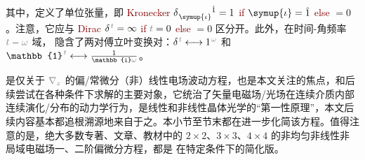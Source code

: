 其中，定义了单位张量，即 \textcolor{Maroon}{Kronecker} $\delta^{\;\! \hphantom{\symup{\iota}} \hat{1}}_{\;\! \symup{\iota} \hphantom{z}} = 1$ \textcolor{Maroon}{if} $\symup{\iota} = \hat{1}$ \textcolor{Maroon}{else} $= 0$。注意，它应与 \textcolor{Maroon}{Dirac} $\delta^{\;\! \mathcolor{gray}{t}} = \infty$ \textcolor{Maroon}{if} $\mathcolor{gray}{t} = 0$ \textcolor{Maroon}{else} $= 0$ 区分开。此外，在时间-角频率 $\mathcolor{gray}{t} - \mathcolor{gray}{\omega}$ 域， 隐含了两对傅立叶变换对：$\delta^{\;\! \mathcolor{gray}{t}} \longleftrightarrow 1^{\;\! \mathcolor{gray}{\omega}}$ 和 $\mathbb{1}^{\;\! \mathcolor{gray}{t}} \longleftrightarrow \frac{1}{\mathbb{i} \mathcolor{gray}{\omega}}$。

 是仅关于 $\mathcolor{gray}{\nabla_z}$ 的偏/常微分（非）线性电场波动方程，也是本文关注的焦点，和后续尝试在各种条件下求解的主要对象，它统治了矢量电磁场/光场在连续介质内部连续演化/分布的动力学行为，是线性和非线性晶体光学的“第一性原理”，本文后续内容基本都追根溯源地来自于之。本小节至节末都在进一步化简该方程。值得注意的是，绝大多数专著、文章、教材中的 $2 \times 2$、$3 \times 3$、$4 \times 4$ 的非均匀非线性非局域电磁场一、二阶偏微分方程\cite{zhangRigorousModelingLaser2015,zhangFullyVectorialSimulation2016,stallingaBerreman4x4Matrix1999,borzdovWavesLinearQuadratic1996,changWavePropagationBianisotropic2014,sturmElectromagneticWavesCrystals2024,sturmElectromagneticWavesCrystals2024,mcleodVectorFourierOptics2014,berryOpticalSingularitiesBianisotropic2005,raabMultipoleTheoryElectromagnetism2004}，都是  在特定条件下的简化版。

